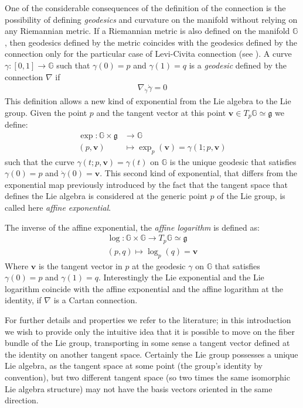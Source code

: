One of the considerable consequences of the definition of the connection is the possibility of defining \emph{geodesics} and curvature on the manifold without relying on any Riemannian metric. If a Riemannian metric is also defined on the manifold $\mathbb{G} $, then geodesics defined by the metric coincides with the geodesics defined by the connection only for the particular case of Levi-Civita connection (see \cite{do1992riemannian}). A curve $\gamma:[0,1]\rightarrow \mathbb{G}$ such that $\gamma(0)=p$ and $\gamma(1) = q$ is a \emph{geodesic} defined by the connection $\nabla$ if 
\begin{align}\label{def:geodesics_eq}
\nabla_{\dot{\gamma}}\dot{\gamma} = 0 %
\end{align}
This definition allows a new kind of exponential from the Lie algebra to the Lie group. Given the point $p$ and the tangent vector at this point $\mathbf{v} \in T_{p}\mathbb{G}\simeq \mathfrak{g}$ we define: 
\begin{align*}
\exp :  \mathbb{G}  \times \mathfrak{g}     &\longrightarrow \mathbb{G}  
\\ 
(p,\mathbf{v}) &\longmapsto \exp_{p}(\mathbf{v})  = \gamma(1; p,\mathbf{v})
\end{align*}
such that the curve $\gamma(t;p,\mathbf{v}) = \gamma(t)$ on $\mathbb{G}$ is the unique geodesic that satisfies $\gamma(0) = p$ and $\dot{\gamma}(0) =  \mathbf{v} $.
This second kind of exponential, that differs from the exponential map previously introduced by the fact that the tangent space that defines the Lie algebra is considered at the generic point $p$ of the Lie group, is called here \emph{affine exponential}.

\noindent
The inverse of the affine exponential, the \emph{affine logarithm} is defined as:
\begin{align*}
\log :  \mathbb{G}  \times \mathbb{G}   \longrightarrow T_{p}\mathbb{G}   \simeq \mathfrak{g} 
\\ 
(p,q) \longmapsto \log_{p}(q)  = \mathbf{v} 
\end{align*}
Where $\mathbf{v} $ is the tangent vector in $p$ at the geodesic $\gamma$ on $\mathbb{G} $ that satisfies $\gamma(0) = p$ and $\gamma(1) = q$. Interestingly the Lie exponential and the Lie logarithm coincide with the affine exponential and the affine logarithm at the identity, if $\nabla$ is a Cartan connection.

For further details and properties we refer to the literature; in this introduction we wish to provide only the intuitive idea that it is possible to move on the fiber bundle of the Lie group, transporting in some sense a tangent vector defined at the identity on another tangent space. Certainly the Lie group possesses a unique Lie algebra, as the tangent space at some point (the group's identity by convention), but two different tangent space (so two times the same isomorphic Lie algebra structure) may not have the basis vectors oriented in the same direction. 

